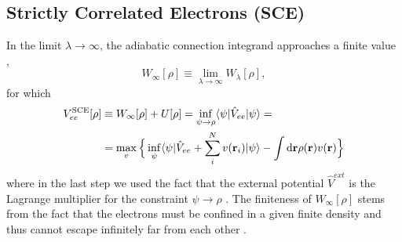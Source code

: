 \documentclass[aps,pra,twocolumn,superscriptaddress]{revtex4}
\begin{document}
\subsection{Strictly Correlated Electrons (SCE)}
\label{firstorderSCE}
In the limit $\lambda\rightarrow\infty$, the adiabatic connection integrand approaches a finite value \cite{Lie-PLA-79,LieOxf-IJQC-81,Sei-PRA-99,SeiGorSav-PRA-07},
\begin{equation}
W_{\infty}[\rho]\equiv\lim_{\lambda\rightarrow\infty}W_{\lambda}[\rho],
\end{equation}
for which
\begin{equation}\begin{aligned}
V_{ee}^{\rm{SCE}}[\rho]&\equiv W_{\infty}[\rho]+U[\rho]=\inf_{\psi\rightarrow\rho}\langle\psi\vert\hat{V}_{ee}\vert\psi\rangle=\\&=\max_{v}\Big\lbrace\inf_{\psi}\langle\psi\vert\hat{V}_{ee}+\sum_i^Nv(\textbf{r}_i)\vert\psi\rangle-\int \text{\rm{d}}\textbf{r}\rho(\textbf{r})v(\textbf{r})\Big\rbrace\label{WinftyasLegendreTransform}
\end{aligned} 
\end{equation}
where in the last step we used the fact that the external potential $\hat{V}^{ext}$ is the Lagrange multiplier for the constraint $\psi\rightarrow\rho$ \citep{Lie-IJQC-83,SeiGorSav-PRA-07,ButDepGor-PRA-12,MenLin-PRB-13}.
The finiteness of $W_{\infty}[\rho]$ stems from the fact that the electrons must be confined in a given finite density and thus cannot escape infinitely far from each other \cite{Lie-PLA-79,LieOxf-IJQC-81,Sei-PRA-99,SeiGorSav-PRA-07}.
\end{document}
